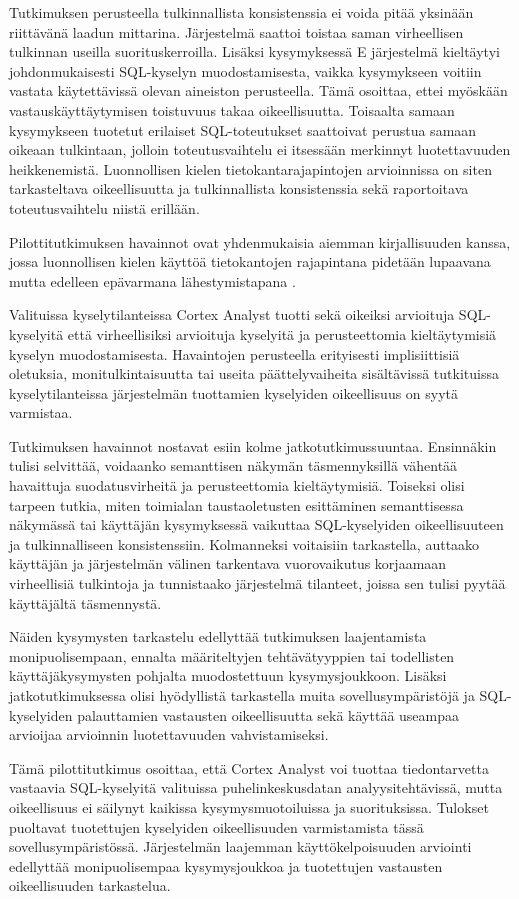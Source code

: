 Tutkimuksen perusteella tulkinnallista konsistenssia ei voida pitää
yksinään riittävänä laadun mittarina. Järjestelmä saattoi toistaa saman
virheellisen tulkinnan useilla suorituskerroilla. Lisäksi kysymyksessä E
järjestelmä kieltäytyi johdonmukaisesti SQL-kyselyn muodostamisesta,
vaikka kysymykseen voitiin vastata käytettävissä olevan aineiston
perusteella. Tämä osoittaa, ettei myöskään vastauskäyttäytymisen
toistuvuus takaa oikeellisuutta. Toisaalta samaan kysymykseen tuotetut
erilaiset SQL-toteutukset saattoivat perustua samaan oikeaan tulkintaan,
jolloin toteutusvaihtelu ei itsessään merkinnyt luotettavuuden
heikkenemistä. Luonnollisen kielen tietokantarajapintojen arvioinnissa
on siten tarkasteltava oikeellisuutta ja tulkinnallista konsistenssia
sekä raportoitava toteutusvaihtelu niistä erillään.

Pilottitutkimuksen havainnot ovat yhdenmukaisia aiemman
kirjallisuuden kanssa, jossa luonnollisen kielen käyttöä
tietokantojen rajapintana pidetään lupaavana mutta edelleen
epävarmana lähestymistapana \cite{liu2024survey,deng2022recent}.

Valituissa kyselytilanteissa Cortex Analyst tuotti sekä
oikeiksi arvioituja SQL-kyselyitä että virheellisiksi
arvioituja kyselyitä ja perusteettomia kieltäytymisiä
kyselyn muodostamisesta. Havaintojen perusteella erityisesti implisiittisiä oletuksia,
monitulkintaisuutta tai useita päättelyvaiheita sisältävissä
tutkituissa kyselytilanteissa järjestelmän tuottamien
kyselyiden oikeellisuus on syytä varmistaa.

Tutkimuksen havainnot nostavat esiin kolme jatkotutkimussuuntaa. Ensinnäkin tulisi selvittää, voidaanko semanttisen näkymän täsmennyksillä vähentää havaittuja suodatusvirheitä ja perusteettomia kieltäytymisiä. Toiseksi olisi tarpeen tutkia, miten toimialan taustaoletusten esittäminen semanttisessa näkymässä tai käyttäjän kysymyksessä vaikuttaa SQL-kyselyiden oikeellisuuteen ja tulkinnalliseen konsistenssiin. Kolmanneksi voitaisiin tarkastella, auttaako käyttäjän ja järjestelmän välinen tarkentava vuorovaikutus korjaamaan virheellisiä tulkintoja ja tunnistaako järjestelmä tilanteet, joissa sen tulisi pyytää käyttäjältä täsmennystä.

Näiden kysymysten tarkastelu edellyttää tutkimuksen laajentamista monipuolisempaan, ennalta määriteltyjen tehtävätyyppien tai todellisten käyttäjäkysymysten pohjalta muodostettuun kysymysjoukkoon. Lisäksi jatkotutkimuksessa olisi hyödyllistä tarkastella muita sovellusympäristöjä ja SQL-kyselyiden palauttamien vastausten oikeellisuutta sekä käyttää useampaa arvioijaa arvioinnin luotettavuuden vahvistamiseksi.

Tämä pilottitutkimus osoittaa, että Cortex Analyst voi tuottaa
tiedontarvetta vastaavia SQL-kyselyitä valituissa
puhelinkeskusdatan analyysitehtävissä, mutta oikeellisuus ei
säilynyt kaikissa kysymysmuotoiluissa ja suorituksissa.
Tulokset puoltavat tuotettujen kyselyiden oikeellisuuden
varmistamista tässä sovellusympäristössä. Järjestelmän laajemman
käyttökelpoisuuden arviointi edellyttää monipuolisempaa
kysymysjoukkoa ja tuotettujen vastausten oikeellisuuden
tarkastelua.
